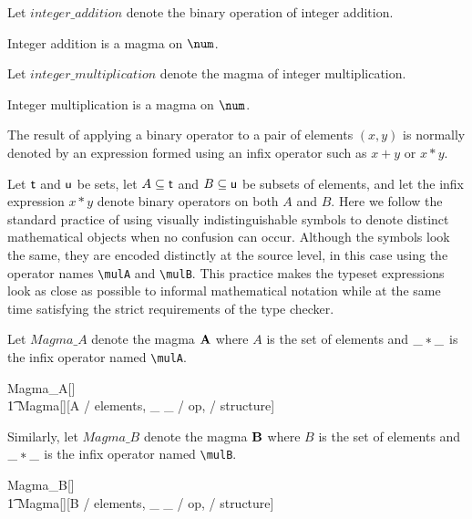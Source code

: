 \documentclass{amsart}
\begin{document}
Let $integer\_addition$ denote the binary operation of integer addition.

\begin{example}
Integer addition is a magma on $\num$.
\end{example}

Let $integer\_multiplication$ denote the magma of integer multiplication.

\begin{example}
Integer multiplication is a magma on $\num$.
\end{example}

The result of applying a binary operator to a pair of elements $(x, y)$ 
is normally denoted by an expression formed using an infix operator such as $x + y$ or $x * y$.

Let $\mathsf{t}$ and $\mathsf{u}$ be sets, 
let $A \subseteq \mathsf{t}$ and $B \subseteq \mathsf{u}$ be subsets of elements,
and let the infix expression $x * y$ denote binary operators on both $A$ and $B$.
Here we follow the standard practice of using visually indistinguishable symbols to denote distinct mathematical
objects when no confusion can occur.
Although the symbols look the same, they are encoded distinctly at the source level,
in this case using the operator names \verb|\mulA| and \verb|\mulB|.
This practice makes the typeset expressions look as close as possible to informal mathematical notation
while at the same time satisfying the strict requirements of the type checker.

Let $Magma\_A$ denote the magma $\mathbf{A}$ where $A$ is the set of elements and 
$\_  \mathbin{*} \_$ is the infix operator named \verb|\mulA|.
\begin{zed}
	Magma\_A[\genT]  \\
	\t1	Magma[\genT][A / elements, \_ \mulA \_ / op, \strucA / structure]
\end{zed}

Similarly, let $Magma\_B$ denote the magma $\mathbf{B}$ where $B$ is the set of elements and 
$\_ \mathbin{*} \_$ is the infix operator named \verb|\mulB|.
\begin{zed}
	Magma\_B[\genT]  \\
	\t1	Magma[\genT][B / elements, \_ \mulB \_ / op, \strucB / structure]
\end{zed}
\end{document}
